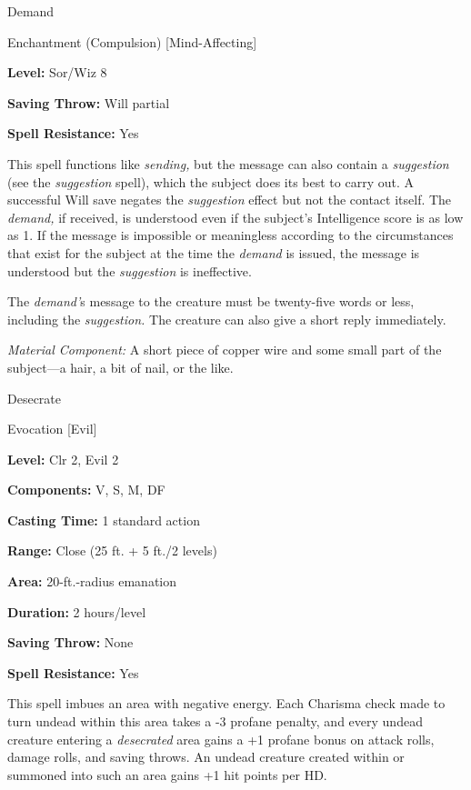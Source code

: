 \documentclass{article}
\begin{document}
\vspace{12pt}
Demand

Enchantment (Compulsion) [Mind-Affecting]

\textbf{Level:} Sor/Wiz 8

\textbf{Saving Throw: }Will partial

\textbf{Spell Resistance:} Yes

This spell functions like \textit{sending, }but the message can also contain a 
\textit{suggestion }(see the \textit{suggestion }spell), which the subject does 
its best to carry out. A successful Will save negates the \textit{suggestion }effect 
but not the contact itself. The \textit{demand, }if received, is understood even 
if the subject's Intelligence score is as low as 1. If the message is impossible 
or meaningless according to the circumstances that exist for the subject at the 
time the \textit{demand }is issued, the message is understood but the \textit{suggestion 
}is ineffective.

The \textit{demand'}s message to the creature must be twenty-five words or less, 
including the \textit{suggestion. }The creature can also give a short reply immediately.

\textit{Material Component: }A short piece of copper wire and some small part of 
the subject---a hair, a bit of nail, or the like.

\vspace{12pt}
Desecrate

Evocation [Evil]

\textbf{Level:} Clr 2, Evil 2

\textbf{Components:} V, S, M, DF

\textbf{Casting Time:} 1 standard action

\textbf{Range:} Close (25 ft. + 5 ft./2 levels)

\textbf{Area:} 20-ft.-radius emanation

\textbf{Duration:} 2 hours/level

\textbf{Saving Throw:} None

\textbf{Spell Resistance:} Yes

This spell imbues an area with negative energy. Each Charisma check made to turn 
undead within this area takes a -3 profane penalty, and every undead creature entering 
a \textit{desecrated }area gains a +1 profane bonus on attack rolls, damage rolls, 
and saving throws. An undead creature created within or summoned into such an area 
gains +1 hit points per HD.
\end{document}
